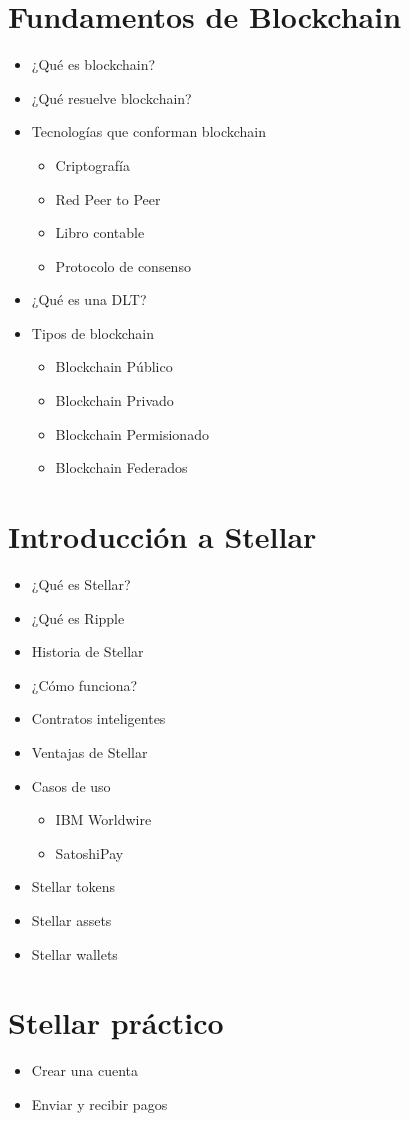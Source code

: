 \documentclass{/home/armando/Documentos/Cursos/LaTeX/Plantillas/lib/temarioptc}
\begin{document}
\vspace*{2mm}
\selectfont
\section{Fundamentos de Blockchain}
\begin{itemize}
	\item ¿Qué es blockchain?
	\item ¿Qué resuelve blockchain?
	\item Tecnologías que conforman blockchain
	\begin{itemize}
		\item Criptografía
		\item Red Peer to Peer
		\item Libro contable
		\item Protocolo de consenso
	\end{itemize}
	\item ¿Qué es una DLT?
	\item Tipos de blockchain
	\begin{itemize}
		\item Blockchain Público
		\item Blockchain Privado
		\item Blockchain Permisionado
		\item Blockchain Federados
	\end{itemize}
\end{itemize}
\section{Introducción a Stellar}
\begin{itemize}
	\item ¿Qué es Stellar?
	\item ¿Qué es Ripple
	\item Historia de Stellar
	\item ¿Cómo funciona?
	\item Contratos inteligentes
	\item Ventajas de Stellar
	\item Casos de uso
	\begin{itemize}
		\item IBM Worldwire
		\item SatoshiPay
	\end{itemize}
	\item Stellar tokens
	\item Stellar assets
	\item Stellar wallets
\end{itemize}
\section{Stellar práctico}
\begin{itemize}
	\item Crear una cuenta
	\item Enviar y recibir pagos
\end{itemize}
\end{document}
